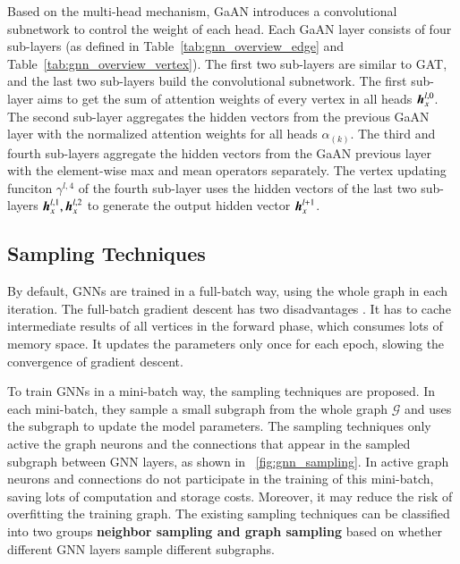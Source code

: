 Based on the multi-head mechanism, GaAN \cite{zhang2018_gaan} introduces a convolutional subnetwork to control the weight of each head.
%
Each GaAN layer consists of four sub-layers (as defined in Table~\ref{tab:gnn_overview_edge} and Table~\ref{tab:gnn_overview_vertex}).
%
The first two sub-layers are similar to GAT, and the last two sub-layers build the convolutional subnetwork.
%
The first sub-layer aims to get the sum of attention weights of every vertex in all heads $\boldsymbol{h}^{l,0}_x$.
The second sub-layer aggregates the hidden vectors from the previous GaAN layer with the normalized attention weights for all heads $\alpha_{(k)}$.
The third and fourth sub-layers aggregate the hidden vectors from the GaAN previous layer with the element-wise max and mean operators separately.
The vertex updating funciton $\gamma^{l,4}$ of the fourth sub-layer uses the hidden vectors of the last two sub-layers $\boldsymbol{h}^{l, 1}_x, \boldsymbol{h}^{l, 2}_x$ to generate the output hidden vector $\boldsymbol{h}^{l+1}_x$.

\subsection{Sampling Techniques}

By default, GNNs are trained in a full-batch way, using the whole graph in each iteration.
The full-batch gradient descent has two disadvantages \cite{chiang2019_cluster_gcn}.
It has to cache intermediate results of all vertices in the forward phase, which consumes lots of memory space.
It updates the parameters only once for each epoch, slowing the convergence of gradient descent.

To train GNNs in a mini-batch way, the sampling techniques are proposed.
In each mini-batch, they sample a small subgraph from the whole graph $\mathcal{G}$ and uses the subgraph to update the model parameters.
The sampling techniques only active the graph neurons and the connections that appear in the sampled subgraph between GNN layers, as shown in \figurename~\ref{fig:gnn_sampling}.
In active graph neurons and connections do not participate in the training of this mini-batch, saving lots of computation and storage costs.
Moreover, it may reduce the risk of overfitting the training graph.
The existing sampling techniques can be classified into two groups \textbf{neighbor sampling and graph sampling} based on whether different GNN layers sample different subgraphs.

